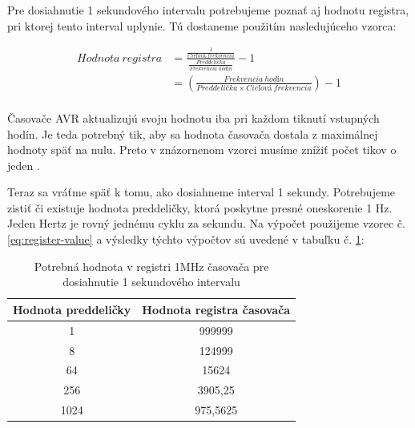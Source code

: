Pre dosiahnutie 1 sekundového intervalu potrebujeme poznať aj hodnotu registra,
pri ktorej tento interval uplynie. Tú dostaneme použitím nasledujúceho vzorca:

\begin{equation} \label{eq:register-value}
    \begin{aligned}
        Hodnota\:registra & = \frac{ \frac{1}{Cieľová\:frekvencia}} { \frac{Preddelička}{Frekvencia\:hodín}} - 1 \\
                          & = (\frac{Frekvencia\:hodín}{Preddelička \times Cieľová\:frekvencia}) - 1             \\
    \end{aligned}
\end{equation}

Časovače AVR aktualizujú svoju hodnotu iba pri každom tiknutí vstupných hodín.
Je teda potrebný tik, aby sa hodnota časovača dostala z maximálnej hodnoty späť na nulu. Preto v znázornenom vzorci
musíme znížiť počet tikov o jeden \cite{atmelATmega64012801281}. \par

Teraz sa vráťme späť k tomu, ako dosiahneme interval 1 sekundy.
Potrebujeme zistiť či existuje hodnota preddeličky, ktorá poskytne presné oneskorenie 1 Hz. Jeden Hertz je rovný jednému cyklu za sekundu. Na výpočet použijeme vzorec
č.\ref{eq:register-value} a výsledky týchto výpočtov sú uvedené v tabuľku č. \ref{table:timerPrescalerValues}:

\begin{table}[!htbp]
    \begin{center}
        \begin{tabular}{|c|c|}
            \hline
            Hodnota preddeličky & Hodnota registra časovača \\
            \hline
            1                   & 999999                    \\
            8                   & 124999                    \\
            64                  & 15624                     \\
            256                 & 3905,25                   \\
            1024                & 975,5625                  \\
            \hline
        \end{tabular}
        \caption{Potrebná hodnota v registri 1MHz časovača pre dosiahnutie 1 sekundového intervalu}
        \label{table:timerPrescalerValues}
    \end{center}
\end{table}

